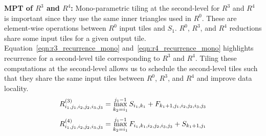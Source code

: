 \textbf{\textbf{MPT} of $R^{3}$ and $R^{4}$:}
Mono-parametric tiling at the second-level for $R^{3}$ and $R^{4}$ is important since they use the same inner triangles used in $R^{0}$. These are element-wise operations between $R^{0}$ input tiles and $S_{1}$. $R^{0}$, $R^{3}$, and $R^{4}$ reductions share some input tiles for a given output tile. Equation~\ref{eqn:r3_recurrence_mono} and~\ref{eqn:r4_recurrence_mono} highlights recurrence for a second-level tile corresponding to $R^{3}$ and $R^{4}$. Tiling these computations at the second-level allows us to schedule the second-level tiles such that they share the same input tiles between $R^{0}$, $R^{3}$, and $R^{4}$ and improve data locality.
\begin{equation}
\label{eqn:r3_recurrence_mono}
R^{(3)}_{i_{1},j_{1},i_{2},j_{2}, i_{3}, j_{3}} = 
    \max\limits_{k_{2}=i_{1}}^{j_{1}-1} S_{i_{1},k_{1}} + F_{k_{1}+1,j_{1}, i_{2}, j_{2}, i_{3}, j_{3}}\\
\end{equation}
\begin{equation}
\label{eqn:r4_recurrence_mono}
R^{(4)}_{i_{1},j_{1},i_{2},j_{2}, i_{3}, j_{3}} = 
    \max\limits_{k_{2}=i_{1}}^{j_{1}-1}  F_{i_{1},k_{1}, i_{2}, j_{2}, i_{3}, j_{3}} + S_{k_{1}+1,j_{1}}\\
\end{equation}


